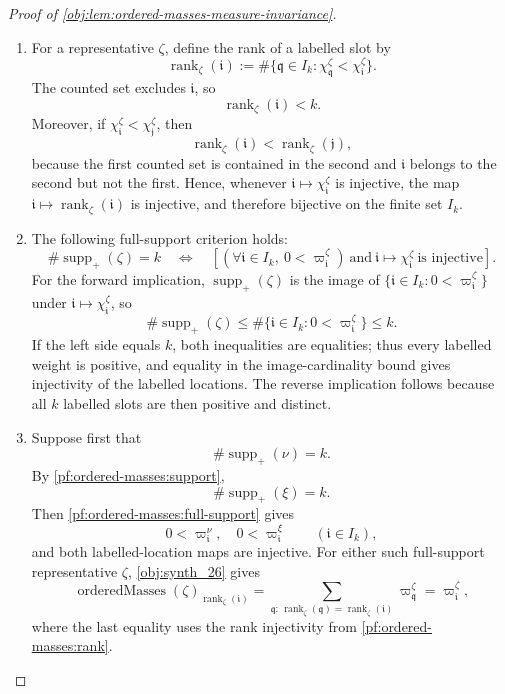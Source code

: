 \begin{proof}[Proof of \cref{obj:lem:ordered-masses-measure-invariance}]
\begin{enumerate}
\item\label{pf:ordered-masses:rank}
For a representative \(\zeta\), define the rank of a labelled slot by
\[
\operatorname{rank}_{\zeta}(\mathfrak i)
:=
\#\{\mathfrak q\in I_k:\chi^\zeta_{\mathfrak q}<\chi^\zeta_{\mathfrak i}\}.
\]
The counted set excludes \(\mathfrak i\), so
\[
\operatorname{rank}_{\zeta}(\mathfrak i)<k .
\]
Moreover, if \(\chi^\zeta_{\mathfrak i}<\chi^\zeta_{\mathfrak j}\), then
\[
\operatorname{rank}_{\zeta}(\mathfrak i)
<
\operatorname{rank}_{\zeta}(\mathfrak j),
\]
because the first counted set is contained in the second and \(\mathfrak i\) belongs to the second but not the first.  Hence, whenever
\(\mathfrak i\mapsto\chi^\zeta_{\mathfrak i}\) is injective, the map
\(\mathfrak i\mapsto\operatorname{rank}_{\zeta}(\mathfrak i)\) is injective, and therefore bijective on the finite set \(I_k\).

\item\label{pf:ordered-masses:full-support}
The following full-support criterion holds:
\[
\#\operatorname{supp}_+(\zeta)=k
\quad\Longleftrightarrow\quad
\left[
(\forall \mathfrak i\in I_k,\ 0<\varpi^\zeta_{\mathfrak i})
\ \text{and}\
\mathfrak i\mapsto\chi^\zeta_{\mathfrak i}\ \text{is injective}
\right].
\]
For the forward implication, \(\operatorname{supp}_+(\zeta)\) is the image of
\(\{\mathfrak i\in I_k:0<\varpi^\zeta_{\mathfrak i}\}\) under
\(\mathfrak i\mapsto\chi^\zeta_{\mathfrak i}\), so
\[
\#\operatorname{supp}_+(\zeta)
\le
\#\{\mathfrak i\in I_k:0<\varpi^\zeta_{\mathfrak i}\}
\le k .
\]
If the left side equals \(k\), both inequalities are equalities; thus every labelled weight is positive, and equality in the image-cardinality bound gives injectivity of the labelled locations.  The reverse implication follows because all \(k\) labelled slots are then positive and distinct.

\item\label{pf:ordered-masses:apply-rank}
Suppose first that
\[
\#\operatorname{supp}_+(\nu)=k .
\]
By \cref{pf:ordered-masses:support},
\[
\#\operatorname{supp}_+(\xi)=k .
\]
Then \cref{pf:ordered-masses:full-support} gives
\[
0<\varpi^\nu_{\mathfrak i},
\quad
0<\varpi^\xi_{\mathfrak i}
\qquad(\mathfrak i\in I_k),
\]
and both labelled-location maps are injective.  For either such full-support representative \(\zeta\), \cref{obj:synth_26} gives
\[
\operatorname{orderedMasses}(\zeta)_{\operatorname{rank}_{\zeta}(\mathfrak i)}
=
\sum_{\mathfrak q:\,
\operatorname{rank}_{\zeta}(\mathfrak q)=\operatorname{rank}_{\zeta}(\mathfrak i)}
\varpi^\zeta_{\mathfrak q}
=
\varpi^\zeta_{\mathfrak i},
\]
where the last equality uses the rank injectivity from \cref{pf:ordered-masses:rank}.


\end{enumerate}
\end{proof}

